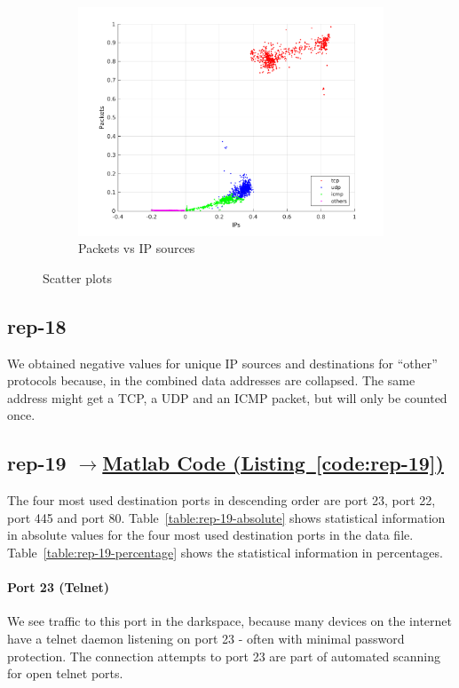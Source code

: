 \documentclass{article}
\newcommand{\codelink}[1]{%
    \hyperref[#1]{\quad$\rightarrow$\enskip Matlab Code (Listing~\ref{#1})}%
}
\begin{document}
\begin{figure}[h]
    \begin{subfigure}{.5\textwidth}
        \centering
        \includegraphics[width=\textwidth]{../exercise-3/plots/rep_17_optional_IPsPackets.png}
        \caption{Packets vs IP sources}
    \end{subfigure}
    \caption{\label{figure:rep-17-optional} Scatter plots}
\end{figure}

\subsection{rep-18}

We obtained negative values for unique IP sources and destinations for ``other'' protocols because, in
the combined data addresses are collapsed. The same address might get a TCP, a UDP and an ICMP packet, but
will only be counted once.

\subsection{rep-19 \codelink{code:rep-19}}

The four most used destination ports in descending order are port 23, port 22, port 445 and port 80.
Table~\ref{table:rep-19-absolute} shows statistical information in absolute values for the
four most used destination ports in the data file. Table~\ref{table:rep-19-percentage} shows the statistical
information in percentages.

\paragraph{Port 23 (Telnet)}
We see traffic to this port in the darkspace, because many devices on the internet have a
telnet daemon listening on port 23 - often with minimal password protection. The connection
attempts to port 23 are part of automated scanning for open telnet ports.
\end{document}
